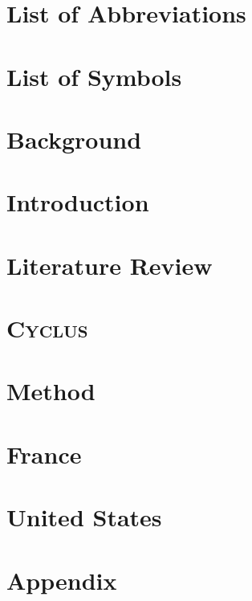 \documentclass{report}
\newcommand{\Cyclus}{\textsc{Cyclus}\xspace}%
\begin{document}

\tableofcontents
\listoftables
\listoffigures

\chapter{List of Abbreviations}
\printglossaries
\chapter{List of Symbols}


\pagebreak

\chapter{Background}


\chapter{Introduction}


\chapter{Literature Review}


\chapter{\Cyclus}


\chapter{Method}


\FloatBarrier


\chapter{France}



\chapter{United States}


\chapter{Appendix}






\end{document}
